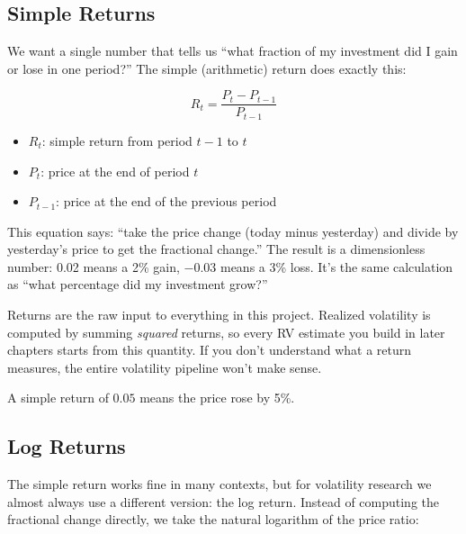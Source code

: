 \subsection{Simple Returns}
\label{sec:simple-returns}

We want a single number that tells us ``what fraction of my investment did I gain or lose in one period?''
The simple (arithmetic) return does exactly this:

\begin{equation}
  R_t = \frac{P_t - P_{t-1}}{P_{t-1}}
  \label{eq:simple-return}
\end{equation}
\begin{itemize}[nosep]
  \item $R_t$: simple return from period $t-1$ to $t$
  \item $P_t$: price at the end of period $t$
  \item $P_{t-1}$: price at the end of the previous period
\end{itemize}

\begin{intuition}
This equation says: ``take the price change (today minus yesterday) and divide by yesterday's price to get the fractional change.''
The result is a dimensionless number: 0.02 means a 2\% gain, $-0.03$ means a 3\% loss.
It's the same calculation as ``what percentage did my investment grow?''
\end{intuition}

\begin{projectconnection}
Returns are the raw input to everything in this project.
Realized volatility is computed by summing \emph{squared} returns, so every RV estimate you build in later chapters starts from this quantity.
If you don't understand what a return measures, the entire volatility pipeline won't make sense.
\end{projectconnection}

A simple return of $0.05$ means the price rose by 5\%.

\subsection{Log Returns}
\label{sec:log-returns}

The simple return works fine in many contexts, but for volatility research we almost always use a different version: the log return.
Instead of computing the fractional change directly, we take the natural logarithm of the price ratio:

